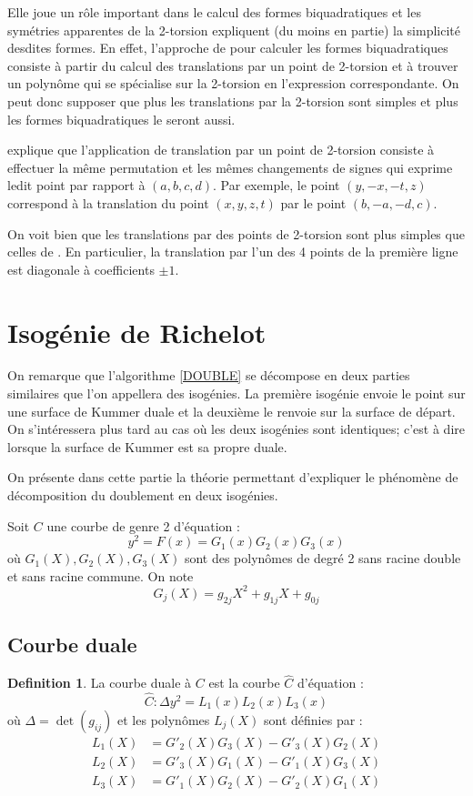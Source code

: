 \documentclass[a4paper]{article}
\theoremstyle{definition}
\newtheorem{definition}{Definition}[section]
\theoremstyle{remark}
\numberwithin{equation}{section}
\begin{document}
Elle joue un rôle important dans le calcul des formes biquadratiques et les symétries apparentes de la 2-torsion expliquent (du moins en partie) la simplicité desdites formes. En effet, l'approche de \citet{cassels-Flynn} pour calculer les formes biquadratiques consiste à partir du calcul des translations par un point de 2-torsion et à trouver un polynôme qui se spécialise sur la 2-torsion en l'expression correspondante. On peut donc supposer que plus les translations par la 2-torsion sont simples et plus les formes biquadratiques le seront aussi.

\citet{gaudry} explique que l'application de translation par un point de 2-torsion consiste à effectuer la même permutation et les mêmes changements de signes qui exprime ledit point par rapport à $(a,b,c,d)$. Par exemple, le point $(y,-x,-t,z)$ correspond à la translation du point $(x,y,z,t)$ par le point $(b,-a,-d,c)$.

On voit bien que les translations par des points de 2-torsion sont plus simples que celles de \citet{eqKum}. En particulier, la translation par l'un des 4 points de la première ligne est diagonale à coefficients $\pm 1$.

\section{Isogénie de Richelot}

On remarque que l'algorithme \ref{DOUBLE} se décompose en deux parties similaires que l'on appellera des isogénies. La première isogénie envoie le point sur une surface de Kummer duale et la deuxième le renvoie sur la surface de départ. On s'intéressera plus tard au cas où les deux isogénies sont identiques; c'est à dire lorsque la surface de Kummer est sa propre duale.

On présente dans cette partie la théorie permettant d'expliquer le phénomène de décomposition du doublement en deux isogénies.

Soit $C$ une courbe de genre 2 d'équation :
$$y^2 = F(x) = G_1(x)G_2(x)G_3(x)$$
où $G_1(X),G_2(X),G_3(X)$ sont des polynômes de degré 2 sans racine double et sans racine commune. On note
$$G_j(X) = g_{2j}X^2 + g_{1j}X + g_{0j}$$

\subsection{Courbe duale}
\begin{definition}
La courbe duale à $C$ est la courbe $\hat{C}$ d'équation :
$$\hat{C} : \Delta y^2 = L_1(x)L_2(x)L_3(x)$$
où $\Delta = \det(g_{ij})$ et les polynômes $L_j(X)$ sont définies par :
\begin{align*}
L_1(X) &= G'_2(X)G_3(X) - G'_3(X)G_2(X) \\
L_2(X) &= G'_3(X)G_1(X) - G'_1(X)G_3(X) \\
L_3(X) &= G'_1(X)G_2(X) - G'_2(X)G_1(X)
\end{align*}
\end{definition}
\end{document}

